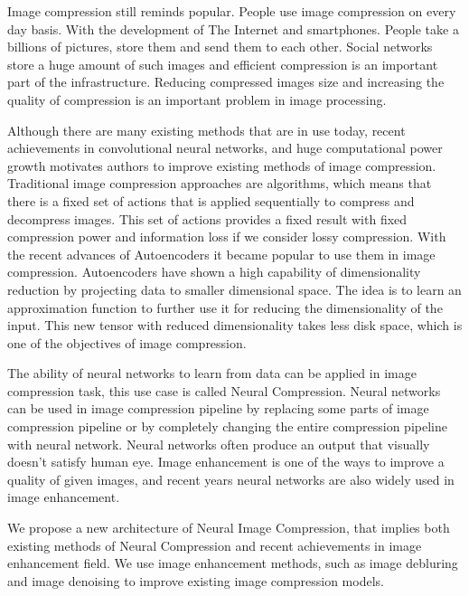 \begin{eabstract}

    Image compression still reminds popular. People use image compression on every day basis. With the development of The Internet and smartphones. People take a billions of pictures, store them and send them to each other. Social networks store a huge amount of such images and efficient compression is an important part of the infrastructure. Reducing compressed images size and increasing the quality of compression is an important problem in image processing.

    Although there are many existing methods that are in use today, recent achievements in convolutional neural networks, and huge computational power growth motivates authors to improve existing methods of image compression. Traditional image compression approaches are algorithms, which means that there is a fixed set of actions that is applied sequentially to compress and decompress images. This set of actions provides a fixed result with fixed compression power and information loss if we consider lossy compression. With the recent advances of Autoencoders it became popular to use them in image compression. Autoencoders have shown a high capability of dimensionality reduction by projecting data to smaller dimensional space. The idea is to learn an approximation function to further use it for reducing the dimensionality of the input. This new tensor with reduced dimensionality takes less disk space, which is one of the objectives of image compression.

    The ability of neural networks to learn from data can be applied in image compression task, this use case is called Neural Compression. Neural networks can be used in image compression pipeline by replacing some parts of image compression pipeline or by completely changing the entire compression pipeline with neural network. Neural networks often produce an output that visually doesn't satisfy human eye. Image enhancement is one of the ways to improve a quality of given images, and recent years neural networks are also widely used in image enhancement.

    We propose a new architecture of Neural Image Compression, that implies both existing methods of  Neural Compression and recent achievements in image enhancement field. We use image enhancement methods, such as image debluring and image denoising to improve existing image compression models.

\end{eabstract}
